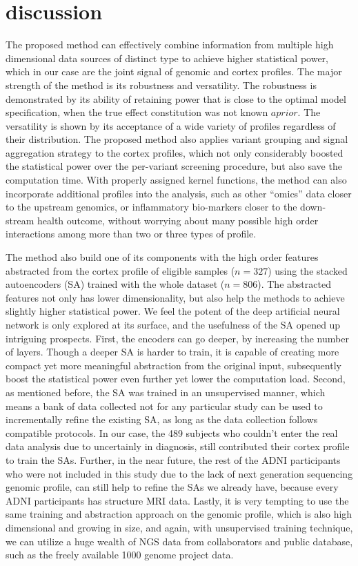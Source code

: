 \section{discussion}
The proposed method can effectively combine information from multiple high dimensional data sources of distinct type to achieve higher statistical power, which in our case are the joint signal of genomic and cortex profiles. The major strength of the method is its robustness and versatility. The robustness is demonstrated by its ability of retaining power that is close to the optimal model specification, when the true effect constitution was not known $a prior$. The versatility is shown by its acceptance of a wide variety of profiles regardless of their distribution. The proposed method also applies variant grouping and signal aggregation strategy to the cortex profiles, which not only considerably boosted the statistical power over the per-variant screening procedure, but also save the computation time. With properly assigned kernel functions, the method can also incorporate additional profiles into the analysis, such as other ``omics'' data closer to the upstream genomics, or inflammatory bio-markers closer to the down-stream health outcome, without worrying about many possible high order interactions among more than two or three types of profile.

The method also build one of its components with the high order features abstracted from the cortex profile of eligible samples ($n=327$) using the stacked autoencoders (SA) trained with the whole dataset ($n=806$). The abstracted features not only has lower dimensionality, but also help the methods to achieve slightly higher statistical power. We feel the potent of the deep artificial neural network is only explored at its surface, and the usefulness of the SA opened up intriguing prospects. First, the encoders can go deeper, by increasing the number of layers. Though a deeper SA is harder to train, it is capable of creating more compact yet more meaningful abstraction from the original input, subsequently boost the statistical power even further yet lower the computation load. Second, as mentioned before, the SA was trained in an unsupervised manner, which means a bank of data collected not for any particular study can be used to incrementally refine the existing SA, as long as the data collection follows compatible protocols. In our case, the 489 subjects who couldn't enter the real data analysis due to uncertainly in diagnosis, still contributed their cortex profile to train the SAs. Further, in the near future, the rest of the ADNI participants who were not included in this study due to the lack of next generation sequencing genomic profile, can still help to refine the SAs we already have, because every ADNI participants has structure MRI data. Lastly, it is very tempting to use the same training and abstraction approach on the genomic profile, which is also high dimensional and growing in size, and again, with unsupervised training technique, we can utilize a huge wealth of NGS data from collaborators and public database, such as the freely available 1000 genome project data.

